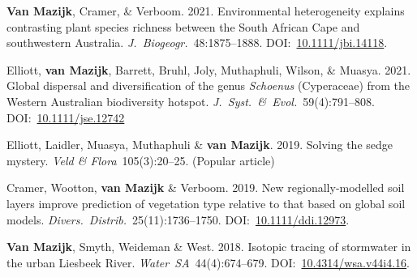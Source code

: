 \begin{hangparas}{2em}{1}

\textbf{Van Mazijk}, Cramer, \& Verboom.
2021.
Environmental heterogeneity explains contrasting plant species richness between
the South African Cape and southwestern Australia.
\textit{J.~Biogeogr.}~48:1875--1888.
DOI:~\href{https://doi.org/10.1111/jbi.14118}{10.1111/jbi.14118}.

Elliott, \textbf{van Mazijk}, Barrett, Bruhl, Joly,
Muthaphuli, Wilson, \& Muasya.
2021.
Global dispersal and
diversification of the genus \textit{Schoenus} (Cyperaceae) from the Western
Australian biodiversity hotspot.
\textit{J.~Syst.~\&~Evol.}~59(4):791--808.
DOI:~\href{https://doi.org/10.1111/jse.1274}{10.1111/jse.12742}

Elliott, Laidler, Muasya, Muthaphuli \& \textbf{van Mazijk}.
2019.
Solving the
sedge mystery.
\textit{Veld \& Flora}~105(3):20--25.
(Popular article)

Cramer, Wootton, \textbf{van Mazijk} \& Verboom.
2019.
New regionally-modelled soil layers improve prediction of vegetation type
relative to that based on global soil models.
\textit{Divers.~Distrib.}~25(11):1736--1750.
DOI:~\href{https://doi.org/10.1111/ddi.12973}{10.1111/ddi.12973}.

\textbf{Van Mazijk}, Smyth, Weideman \& West.
2018.
Isotopic tracing of stormwater in the urban Liesbeek River.
\textit{Water~SA}~44(4):674--679.
DOI:~\href{https://doi.org/10.4314/wsa.v44i4.16}{10.4314/wsa.v44i4.16}.

\end{hangparas}
